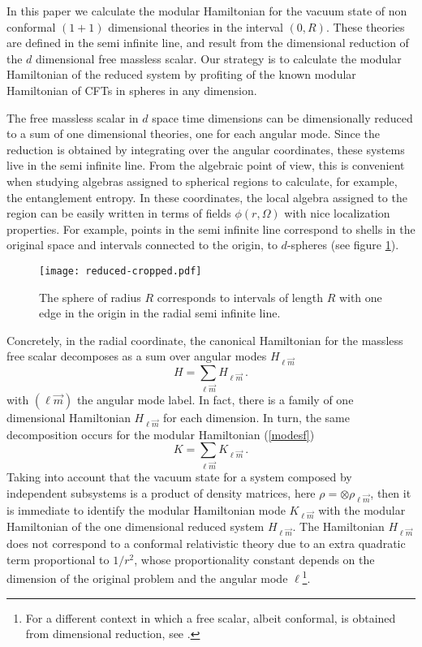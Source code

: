 \documentclass[12pt,a4paper]{article}
\newcommand{\be}{\begin{equation}}
\newcommand{\ee}{\end{equation}}
\def\be{\begin{equation}}
\def\ee{\end{equation}}
\begin{document}
In this paper we calculate the modular Hamiltonian for the vacuum state of non conformal $(1+1)$ dimensional theories in the interval $(0,R)$. These theories are defined in the semi infinite line, and result from the dimensional reduction of the $d$ dimensional free massless scalar.
Our strategy is to calculate the modular Hamiltonian of the reduced system by profiting of the known modular Hamiltonian of CFTs in spheres in any dimension. 

The free massless scalar in $d$ space time dimensions can be dimensionally reduced to a sum of one dimensional theories, one for each angular mode. Since the reduction is obtained by integrating over the angular coordinates, these systems live in the semi infinite line. From the algebraic point of view, this is convenient when studying algebras assigned to spherical regions to calculate, for example, the entanglement entropy. In these coordinates, the local algebra assigned to the region can be easily written in terms of fields $\phi(r,\Omega)$ with nice localization properties. For example, points in the semi infinite line correspond to shells in the original space and intervals connected to the origin, to $d$-spheres (see figure \ref{sphere_interval}).
\begin{figure}[t]
\begin{center}  
\texttt{[image: reduced-cropped.pdf]}
\captionsetup{width=0.9\textwidth}
\caption{The sphere of radius $R$ corresponds to intervals of length $R$ with one edge in the origin in the radial semi infinite line. }
\label{sphere_interval}
\end{center}  
\end{figure}  
Concretely, in the radial coordinate, the canonical Hamiltonian for the massless free scalar decomposes as a sum over angular modes $H_{\ell \vec{m}}$
\be
H=\sum_{\ell \vec{m}}H_{\ell \vec{m}}\,.
\ee
with $(\ell \vec{m})$ the angular mode label.
In fact, there is a family of one dimensional Hamiltonian $H_{\ell \vec{m}}$ for each dimension.
In turn, the same decomposition occurs for the modular Hamiltonian (\ref{modesf})
\be
K=\sum_{\ell \vec{m}}K_{\ell \vec{m}}\,.
\ee
Taking into account that the vacuum state for a system composed by independent subsystems is a product of density matrices, here $\rho=\otimes\rho_{\ell \vec{m}}$, then it is immediate to identify the modular Hamiltonian mode $K_{\ell \vec{m}}$ with the modular Hamiltonian of the one dimensional reduced system $H_{\ell \vec{m}}$. The Hamiltonian $H_{\ell \vec{m}}$ does not correspond to a conformal relativistic theory due to an extra quadratic term proportional to $1/r^2$, whose proportionality constant depends on the dimension of the original problem and the angular mode $\ell$\footnote{For a different context in which a free scalar, albeit conformal, is obtained from dimensional reduction, see \cite{Edery:2009vr}.}.
\end{document}
